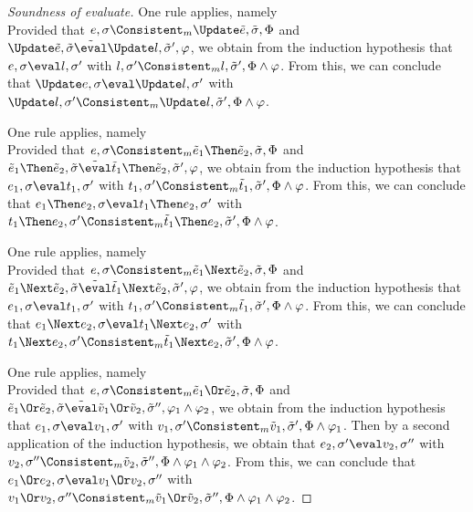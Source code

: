 \begin{proof}[Soundness of evaluate]
    {One rule applies, namely \\
    Provided that $e,\sigma\Consistent_m \Update\tilde{e},\tilde{\sigma},\Phi$ and $\Update\tilde{e},\tilde{\sigma}\tilde{\eval}\Update l,\tilde{\sigma}',\phi$,
    we obtain from the induction hypothesis that $e,\sigma\eval l,\sigma'$ with $l,\sigma'\Consistent_m l,\tilde{\sigma}',\Phi\land\phi$.
    From this, we can conclude that $\Update e,\sigma\eval \Update l ,\sigma'$ with $\Update l,\sigma'\Consistent_m \Update l,\tilde{\sigma}',\Phi\land\phi$.

    }

    {One rule applies, namely \\
    Provided that $e,\sigma\Consistent_m \tilde{e}_1\Then \tilde{e}_2,\tilde{\sigma},\Phi$ and $\tilde{e}_1\Then \tilde{e}_2,\tilde{\sigma}\tilde{\eval}\tilde{t}_1\Then \tilde{e}_2,\tilde{\sigma}',\phi$,
    we obtain from the induction hypothesis that $e_1,\sigma\eval t_1,\sigma'$ with $t_1,\sigma'\Consistent_m \tilde{t}_1,\tilde{\sigma}',\Phi\land\phi$.
    From this, we can conclude that $e_1\Then e_2,\sigma\eval t_1\Then e_2,\sigma'$ with $t_1\Then e_2,\sigma'\Consistent_m \tilde{t}_1\Then e_2,\tilde{\sigma}',\Phi\land\phi$.

    }

    {One rule applies, namely \\
    Provided that $e,\sigma\Consistent_m \tilde{e}_1\Next \tilde{e}_2,\tilde{\sigma},\Phi$ and $\tilde{e}_1\Next \tilde{e}_2,\tilde{\sigma}\tilde{\eval}\tilde{t}_1\Next \tilde{e}_2,\tilde{\sigma}',\phi$,
    we obtain from the induction hypothesis that $e_1,\sigma\eval t_1,\sigma'$ with $t_1,\sigma'\Consistent_m \tilde{t}_1,\tilde{\sigma}',\Phi\land\phi$.
    From this, we can conclude that $e_1\Next e_2,\sigma\eval t_1\Next e_2,\sigma'$ with $t_1\Next e_2,\sigma'\Consistent_m \tilde{t}_1\Next e_2,\tilde{\sigma}',\Phi\land\phi$.

    }

    {One rule applies, namely \\
    Provided that $e,\sigma\Consistent_m\tilde{e}_1 \Or \tilde{e}_2,\tilde{\sigma},\Phi$ and $\tilde{e}_1 \Or \tilde{e}_2,\tilde{\sigma}\tilde{\eval}\tilde{v}_1\Or \tilde{v}_2,\tilde{\sigma}'',\phi_1\land\phi_2$,
    we obtain from the induction hypothesis that $e_1,\sigma\eval v_1,\sigma'$ with $v_1,\sigma'\Consistent_m\tilde{v}_1,\tilde{\sigma}',\Phi\land\phi_1$.
    Then by a second application of the induction hypothesis, we obtain that $e_2,\sigma'\eval v_2,\sigma''$ with $v_2,\sigma''\Consistent_m\tilde{v}_2,\tilde{\sigma}'',\Phi\land\phi_1\land\phi_2$.
    From this, we can conclude that $e_1 \Or e_2,\sigma\eval v_1 \Or v_2,\sigma''$ with $v_1 \Or v_2,\sigma''\Consistent_m\tilde{v}_1 \Or \tilde{v}_2,\tilde{\sigma}'',\Phi\land\phi_1\land\phi_2$.

}
\end{proof}
